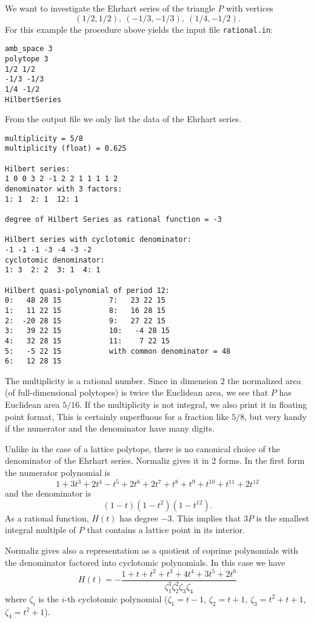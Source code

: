 \documentclass[12pt,a4paper]{scrartcl}
\theoremstyle{definition}
\def\ttt{\texttt}
\begin{document}
We want to investigate the Ehrhart series of the triangle $P$
with vertices
$$
(1/2,1/2),\ (-1/3,-1/3),\ (1/4,-1/2).
$$
For this example the procedure above yields the input file \ttt{rational.in}:

\begin{Verbatim}
amb_space 3
polytope 3
1/2 1/2
-1/3 -1/3
1/4 -1/2
HilbertSeries
\end{Verbatim}

From the output file we only list the data of the Ehrhart series.
\begin{Verbatim}
multiplicity = 5/8
multiplicity (float) = 0.625

Hilbert series:
1 0 0 3 2 -1 2 2 1 1 1 1 2 
denominator with 3 factors:
1: 1  2: 1  12: 1  

degree of Hilbert Series as rational function = -3

Hilbert series with cyclotomic denominator:
-1 -1 -1 -3 -4 -3 -2 
cyclotomic denominator:
1: 3  2: 2  3: 1  4: 1  

Hilbert quasi-polynomial of period 12:
0:   48 28 15			7:   23 22 15
1:   11 22 15			8:   16 28 15
2:  -20 28 15			9:   27 22 15
3:   39 22 15			10:   -4 28 15
4:   32 28 15			11:    7 22 15
5:   -5 22 15			with common denominator = 48
6:   12 28 15
\end{Verbatim}
The multiplicity is a rational number. Since in dimension $2$
the normalized area (of full-dimensional polytopes) is twice
the Euclidean area, we see that $P$ has Euclidean area $5/16$. If the multiplicity is not integral, we also print it in floating point format, This is certainly superfluous for a fraction like $5/8$, but very handy if the numerator and the denominator have many digits.

Unlike in the case of a lattice polytope, there is no canonical choice of the denominator of the Ehrhart series. Normaliz gives it in $2$ forms. In the first form the numerator polynomial is
$$
1+3t^3+2t^4-t^5+2t^6+2t^7+t^8+t^9+t^{10}+t^{11}+2t^{12}
$$
and the denominator is
$$
(1-t)(1-t^2)(1-t^{12}).
$$
As a rational function, $H(t)$ has degree $-3$. This implies
that $3P$ is the smallest integral multiple of $P$ that
contains a lattice point in its interior.

Normaliz gives also a representation as a quotient of coprime
polynomials with the denominator factored into cyclotomic
polynomials. In this case
we have
$$
H(t)=-\frac{1+t+t^2+t^3+4t^4+3t^5+2t^6}{\zeta_1^3\zeta_2^2\zeta_3\zeta_4}
$$
where $\zeta_i$ is the $i$-th cyclotomic polynomial
($\zeta_1=t-1$, $\zeta_2=t+1$, $\zeta_3=t^2+t+1$,
$\zeta_4=t^2+1$).
\end{document}
